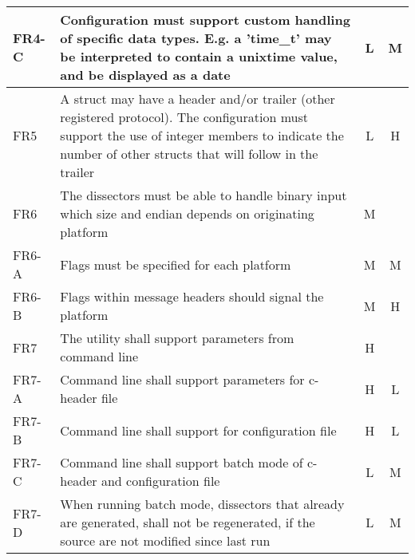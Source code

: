 \begin{table}[ht]
{\begin{tabularx}{1.2\textwidth}{l X c c}
	FR4-C & Configuration must support custom handling of specific data types. E.g. a 'time\_t' may be interpreted to contain a unixtime value, and be displayed as a date & L & M \\
	\midrule
	FR5 & A struct may have a header and/or trailer (other registered protocol). The configuration must support the use of integer members to indicate the number of other structs that will follow in the trailer & L & H \\
	\midrule
	FR6 & The dissectors must be able to handle binary input which size and endian depends on originating platform & M & \\
	FR6-A & Flags must be specified for each platform & M & M \\
	FR6-B & Flags within message headers should signal the platform & M & H \\
	\midrule
	FR7 & The utility shall support parameters from command line & H & \\
	FR7-A & Command line shall support parameters for c-header file & H & L \\
	FR7-B & Command line shall support for configuration file & H & L \\
	FR7-C & Command line shall support batch mode of c-header and configuration file & L & M \\
	FR7-D & When running batch mode, dissectors that already are generated, shall not be regenerated, if the source are not modified since last run & L & M \\
	\bottomrule
\end{tabularx}}
\end{table}


